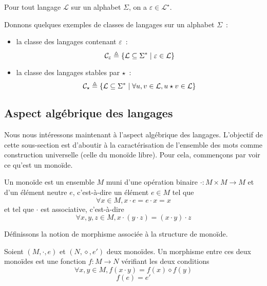 \begin{exercise}
  Pour tout langage $\mathcal L$ sur un alphabet $\Sigma$, on a
  $\varepsilon \in \mathcal L^\star$.
\end{exercise}

\begin{example}
  Donnons quelques exemples de classes de langages sur un alphabet $\Sigma$~:
  \begin{itemize}
  \item la classe des langages contenant $\varepsilon$~:
    \[\mathcal C_\varepsilon \triangleq \{\mathcal L \subseteq \Sigma^*\mid
    \varepsilon \in \mathcal L\}\]
  \item la classe des langages stables par $\star$~:
    \[\mathcal C_\star \triangleq \{\mathcal L \subseteq \Sigma^*\mid
    \forall u,v\in\mathcal L, u\star v \in \mathcal L\}\]
  \end{itemize}
\end{example}

\subsection{Aspect algébrique des langages}

Nous nous intéressons maintenant à l'aspect algébrique des langages. L'objectif
de cette sous-section est d'aboutir à la caractérisation de l'ensemble des mots
comme construction universelle (celle du monoïde libre). Pour cela, commençons
par voir ce qu'est un monoïde.

\begin{definition}[Monoïde]
  Un monoïde est un ensemble $M$ muni d'une opération binaire
  $\cdot : M \times M \to M$ et d'un élément neutre $e$,
  c'est-à-dire un élément $e\in M$ tel que
  \[\forall x\in M, x\cdot e = e \cdot x = x\]
  et tel que $\cdot$ est associative, c'est-à-dire
  \[\forall x,y,z\in M, x\cdot (y\cdot z) = (x\cdot y) \cdot z\]
\end{definition}

Définissons la notion de morphisme associée à la structure de monoïde.

\begin{definition}
  Soient $(M,\cdot,e)$ et $(N,\diamond,e')$ deux monoïdes. Un morphisme entre
  ces deux monoïdes est une fonction $f : M \to N$ vérifiant les deux conditions
  \begin{equation}
    \forall x,y\in M, f(x\cdot y) = f(x)\diamond f(y)
  \end{equation}
  \begin{equation}
    f(e) = e'
  \end{equation}
\end{definition}

